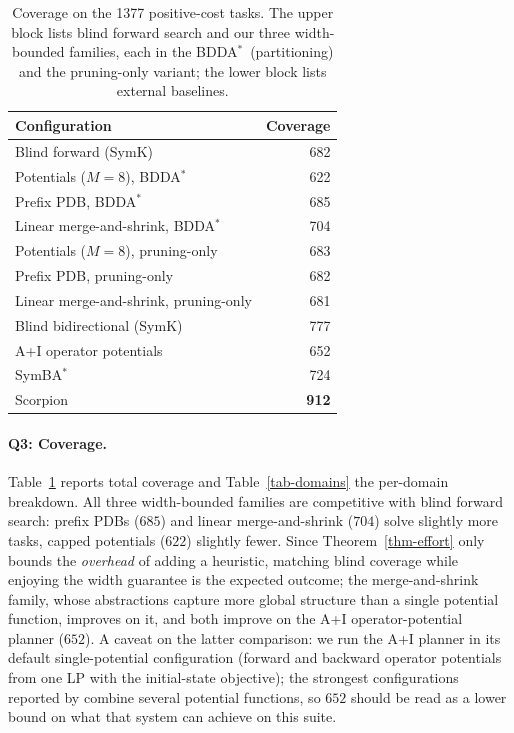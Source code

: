 \documentclass[letterpaper]{article}
\newcommand{\bddastar}{BDDA\ensuremath{^{*}}}
\newcommand{\symba}{SymBA\ensuremath{^{*}}}
\theoremstyle{plain}
\theoremstyle{definition}
\theoremstyle{remark}
\begin{document}
\begin{table}[t]
\centering
\begin{tabular}{lr}
\toprule
Configuration & Coverage \\
\midrule
Blind forward (SymK) & 682 \\
Potentials ($M = 8$), \bddastar & 622 \\
Prefix PDB, \bddastar & 685 \\
Linear merge-and-shrink, \bddastar & 704 \\
Potentials ($M = 8$), pruning-only & 683 \\
Prefix PDB, pruning-only & 682 \\
Linear merge-and-shrink, pruning-only & 681 \\
\midrule
Blind bidirectional (SymK) & 777 \\
A+I operator potentials \citep{fiser-et-al-aij2024} & 652 \\
\symba\ \citep{torralba-et-al-aij2017} & 724 \\
Scorpion \citep{seipp-et-al-jair2020} & \textbf{912} \\
\bottomrule
\end{tabular}
\caption{Coverage on the 1377 positive-cost tasks. The upper block lists
blind forward search and our three width-bounded families, each in the
\bddastar\ (partitioning) and the pruning-only variant; the lower block
lists external baselines.}
\label{tab-coverage}
\end{table}

\paragraph{Q3: Coverage.}
Table~\ref{tab-coverage} reports total coverage and
Table~\ref{tab-domains} the per-domain breakdown. All three width-bounded
families are competitive with blind forward search: prefix PDBs ($685$)
and linear merge-and-shrink ($704$) solve slightly more tasks, capped
potentials ($622$) slightly fewer. Since Theorem~\ref{thm-effort} only
bounds the \emph{overhead} of adding a heuristic, matching blind coverage
while enjoying the width guarantee is the expected outcome; the
merge-and-shrink family, whose abstractions capture more global structure
than a single potential function, improves on it, and both improve on the
A+I operator-potential planner ($652$). A caveat on the latter
comparison: we run the A+I planner in its default single-potential
configuration (forward and backward operator potentials from one LP with
the initial-state objective); the strongest configurations reported by
\citet{fiser-et-al-aij2024} combine several potential functions, so
$652$ should be read as a lower bound on what that system can achieve on
this suite.
\end{document}
